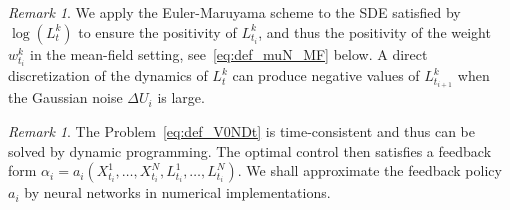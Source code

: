 \documentclass[11pt]{article}
\numberwithin{equation}{section}
\theoremstyle{plain}
\theoremstyle{definition}
\theoremstyle{remark}
\newtheorem{remark}[theorem]{Remark}
\begin{document}
	\begin{remark}
		We apply the Euler-Maruyama scheme to the SDE satisfied by $\log(L_t^k)$ to ensure the positivity of $L_{t_i}^k$, and thus the positivity of the weight $w_{t_i}^k$ in the mean-field setting, see~\eqref{eq:def_muN_MF} below. A direct discretization of the dynamics of $L_t^k$ can produce negative values of $L_{t_{i+1}}^k$ when the Gaussian noise $\Delta U_i$ is large. 
	\end{remark}
	
	\begin{remark} \label{rem:feedback-control}
		The Problem~\eqref{eq:def_V0NDt} is time-consistent and thus can be solved by dynamic programming. The optimal control then satisfies a feedback form $\alpha_i = a_i(X_{t_i}^1,\dots, X_{t_i}^N, L_{t_i}^1,\dots, L_{t_i}^N)$. We shall approximate the feedback policy $a_i$ by neural networks in numerical implementations. 
	\end{remark}
	
\end{document}
